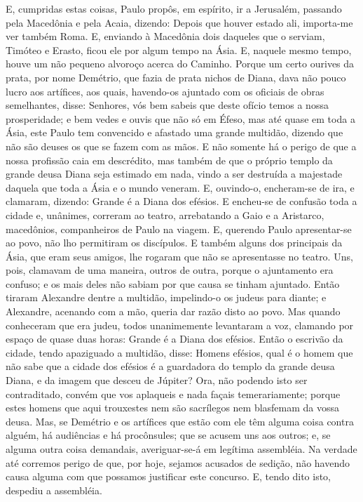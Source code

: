 E, cumpridas estas coisas, Paulo propôs, em espírito, ir a
Jerusalém, passando pela Macedônia e pela Acaia, dizendo: Depois que
houver estado ali, importa-me ver também Roma. E, enviando à
Macedônia dois daqueles que o serviam, Timóteo e Erasto, ficou ele
por algum tempo na Ásia. E, naquele mesmo tempo, houve um não
pequeno alvoroço acerca do Caminho. Porque um certo ourives
da prata, por nome Demétrio, que fazia de prata nichos de Diana,
dava não pouco lucro aos artífices, aos quais, havendo-os
ajuntado com os oficiais de obras semelhantes, disse: Senhores, vós
bem sabeis que deste ofício temos a nossa prosperidade; e bem
vedes e ouvis que não só em Éfeso, mas até quase em toda a Ásia,
este Paulo tem convencido e afastado uma grande multidão, dizendo
que não são deuses os que se fazem com as mãos. E não somente
há o perigo de que a nossa profissão caia em descrédito, mas também
de que o próprio templo da grande deusa Diana seja estimado em nada,
vindo a ser destruída a majestade daquela que toda a Ásia e o mundo
veneram. E, ouvindo-o, encheram-se de ira, e clamaram,
dizendo: Grande é a Diana dos efésios. E encheu-se de
confusão toda a cidade e, unânimes, correram ao teatro, arrebatando
a Gaio e a Aristarco, macedônios, companheiros de Paulo na viagem.
E, querendo Paulo apresentar-se ao povo, não lho permitiram
os discípulos. E também alguns dos principais da Ásia, que
eram seus amigos, lhe rogaram que não se apresentasse no teatro.
Uns, pois, clamavam de uma maneira, outros de outra, porque o
ajuntamento era confuso; e os mais deles não sabiam por que causa se
tinham ajuntado. Então tiraram Alexandre dentre a multidão,
impelindo-o os judeus para diante; e Alexandre, acenando com a mão,
queria dar razão disto ao povo. Mas quando conheceram que era
judeu, todos unanimemente levantaram a voz, clamando por espaço de
quase duas horas: Grande é a Diana dos efésios. Então o
escrivão da cidade, tendo apaziguado a multidão, disse: Homens
efésios, qual é o homem que não sabe que a cidade dos efésios é a
guardadora do templo da grande deusa Diana, e da imagem que desceu
de Júpiter? Ora, não podendo isto ser contraditado, convém
que vos aplaqueis e nada façais temerariamente; porque estes
homens que aqui trouxestes nem são sacrílegos nem blasfemam da vossa
deusa. Mas, se Demétrio e os artífices que estão com ele têm
alguma coisa contra alguém, há audiências e há procônsules; que se
acusem uns aos outros; e, se alguma outra coisa demandais,
averiguar-se-á em legítima assembléia. Na verdade até
corremos perigo de que, por hoje, sejamos acusados de sedição, não
havendo causa alguma com que possamos justificar este concurso.
E, tendo dito isto, despediu a assembléia.

